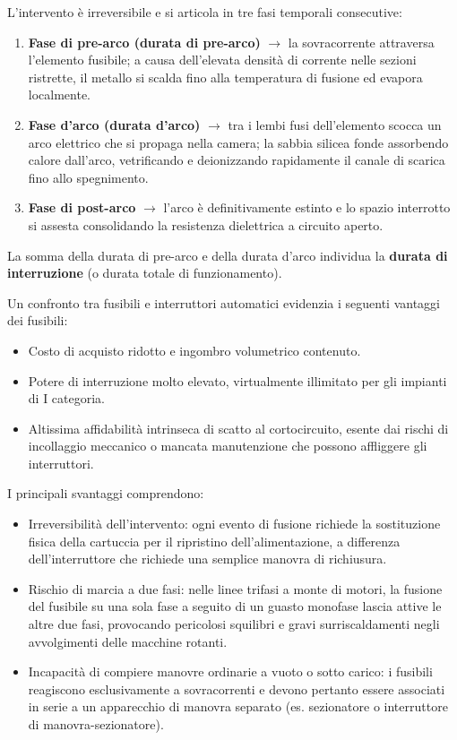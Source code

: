 L'intervento è irreversibile e si articola in tre fasi temporali consecutive:
\begin{enumerate}
    \item \textbf{Fase di pre-arco (durata di pre-arco)} $\rightarrow$ la sovracorrente attraversa l'elemento fusibile; a causa dell'elevata densità di corrente nelle sezioni ristrette, il metallo si scalda fino alla temperatura di fusione ed evapora localmente.
    \item \textbf{Fase d'arco (durata d'arco)} $\rightarrow$ tra i lembi fusi dell'elemento scocca un arco elettrico che si propaga nella camera; la sabbia silicea fonde assorbendo calore dall'arco, vetrificando e deionizzando rapidamente il canale di scarica fino allo spegnimento.
    \item \textbf{Fase di post-arco} $\rightarrow$ l'arco è definitivamente estinto e lo spazio interrotto si assesta consolidando la resistenza dielettrica a circuito aperto.
\end{enumerate}
La somma della durata di pre-arco e della durata d'arco individua la \textbf{durata di interruzione} (o durata totale di funzionamento).

Un confronto tra fusibili e interruttori automatici evidenzia i seguenti vantaggi dei fusibili:
\begin{itemize}
    \item Costo di acquisto ridotto e ingombro volumetrico contenuto.
    \item Potere di interruzione molto elevato, virtualmente illimitato per gli impianti di I categoria.
    \item Altissima affidabilità intrinseca di scatto al cortocircuito, esente dai rischi di incollaggio meccanico o mancata manutenzione che possono affliggere gli interruttori.
\end{itemize}

I principali svantaggi comprendono:
\begin{itemize}
    \item Irreversibilità dell'intervento: ogni evento di fusione richiede la sostituzione fisica della cartuccia per il ripristino dell'alimentazione, a differenza dell'interruttore che richiede una semplice manovra di richiusura.
    \item Rischio di marcia a due fasi: nelle linee trifasi a monte di motori, la fusione del fusibile su una sola fase a seguito di un guasto monofase lascia attive le altre due fasi, provocando pericolosi squilibri e gravi surriscaldamenti negli avvolgimenti delle macchine rotanti.
    \item Incapacità di compiere manovre ordinarie a vuoto o sotto carico: i fusibili reagiscono esclusivamente a sovracorrenti e devono pertanto essere associati in serie a un apparecchio di manovra separato (es. sezionatore o interruttore di manovra-sezionatore).
\end{itemize}

